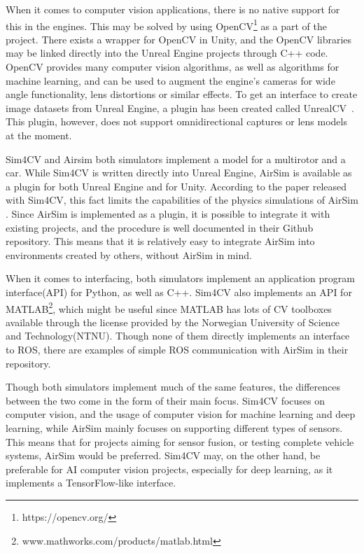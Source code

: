 When it comes to computer vision applications, there is no native support for this in the engines. This may be solved by using OpenCV\footnote{https://opencv.org/} as a part of the project. There exists a wrapper for OpenCV in Unity, and the OpenCV libraries may be linked directly into the Unreal Engine projects through C++ code. OpenCV provides many computer vision algorithms, as well as algorithms for machine learning, and can be used to augment the engine's cameras for wide angle functionality, lens distortions or similar effects. To get an interface to create image datasets from Unreal Engine, a plugin has been created called UnrealCV~\cite{UnrealCV}. This plugin, however, does not support omnidirectional captures or lens models at the moment.

Sim4CV and Airsim both simulators implement a model for a multirotor and a car. While Sim4CV is written directly into Unreal Engine, AirSim is available as a plugin for both Unreal Engine and for Unity. According to the paper released with Sim4CV, this fact limits the capabilities of the physics simulations of AirSim \cite{Sim4CV_paper}. Since AirSim is implemented as a plugin, it is possible to integrate it with existing projects, and the procedure is well documented in their Github repository. This means that it is relatively easy to integrate AirSim into environments created by others, without AirSim in mind. 

When it comes to interfacing, both simulators implement an application program interface(API) for Python, as well as C++. Sim4CV also implements an API for MATLAB\footnote{www.mathworks.com/products/matlab.html}, which might be useful since MATLAB has lots of CV toolboxes available through the license provided by the Norwegian University of Science and Technology(NTNU). Though none of them directly implements an interface to ROS, there are examples of simple ROS communication with AirSim in their repository.

Though both simulators implement much of the same features, the differences between the two come in the form of their main focus. Sim4CV focuses on computer vision, and the usage of computer vision for machine learning and deep learning, while AirSim mainly focuses on supporting different types of sensors. This means that for projects aiming for sensor fusion, or testing complete vehicle systems, AirSim would be preferred. Sim4CV may, on the other hand, be preferable for AI computer vision projects, especially for deep learning, as it implements a TensorFlow-like interface.

